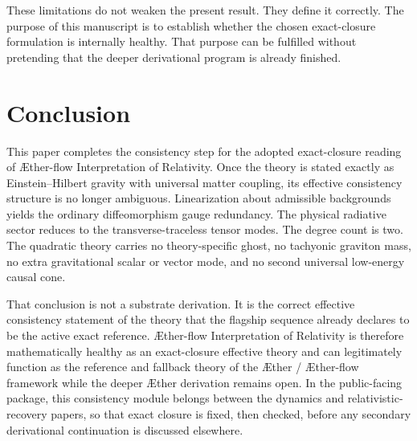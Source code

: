 \documentclass[11pt]{article}
\newcommand{\Aether}{\AE{}ther}
\newcommand{\Aflow}{\AE{}ther-flow}
\newcommand{\TheoryName}{\Aflow{} Interpretation of Relativity}
\newcommand{\TheoryProgram}{\Aether{} / \Aflow{} framework}
\begin{document}
These limitations do not weaken the present result. They define it correctly. The purpose of this manuscript is to establish whether the chosen exact-closure formulation is internally healthy. That purpose can be fulfilled without pretending that the deeper derivational program is already finished.

\section{Conclusion}

This paper completes the consistency step for the adopted exact-closure reading of \TheoryName{}. Once the theory is stated exactly as Einstein--Hilbert gravity with universal matter coupling, its effective consistency structure is no longer ambiguous. Linearization about admissible backgrounds yields the ordinary diffeomorphism gauge redundancy. The physical radiative sector reduces to the transverse-traceless tensor modes. The degree count is two. The quadratic theory carries no theory-specific ghost, no tachyonic graviton mass, no extra gravitational scalar or vector mode, and no second universal low-energy causal cone.

That conclusion is not a substrate derivation. It is the correct effective consistency statement of the theory that the flagship sequence already declares to be the active exact reference. \TheoryName{} is therefore mathematically healthy as an exact-closure effective theory and can legitimately function as the reference and fallback theory of the \TheoryProgram{} while the deeper \Aether{} derivation remains open. In the public-facing package, this consistency module belongs between the dynamics and relativistic-recovery papers, so that exact closure is fixed, then checked, before any secondary derivational continuation is discussed elsewhere.
\end{document}
